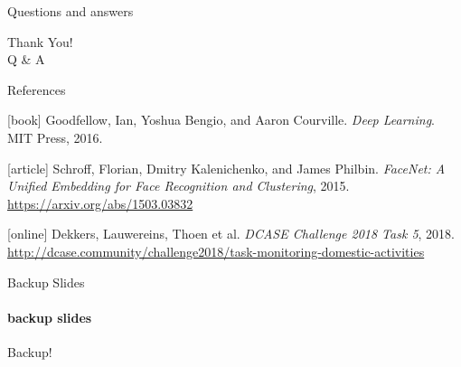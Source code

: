 \documentclass[aspectratio=169]{beamer}
\begin{document}

\begin{frame}{Questions and answers}
    \begin{center}
    {\fontsize{40}{50}\selectfont Thank You! \\[10pt] Q \& A}
    \end{center}
\end{frame}


\begin{frame}[allowframebreaks]{References}
    \begin{thebibliography}{}
        [book]
        Goodfellow, Ian, Yoshua Bengio, and Aaron Courville.
        \newblock \emph{Deep Learning}.
        \newblock MIT Press, 2016.
        
        [article]
        Schroff, Florian, Dmitry Kalenichenko, and James Philbin.
        \newblock \emph{FaceNet: A Unified Embedding for Face Recognition and Clustering}, 2015.
        \newblock \url{https://arxiv.org/abs/1503.03832}
        
        [online]
        Dekkers, Lauwereins, Thoen et al.
        \newblock \emph{DCASE Challenge 2018 Task 5}, 2018.
        \newblock \url{http://dcase.community/challenge2018/task-monitoring-domestic-activities}
    \end{thebibliography}
\end{frame}


\begin{frame}{Backup Slides}
	\framesubtitle{backup slides}
	Backup!
\end{frame}

\end{document}
